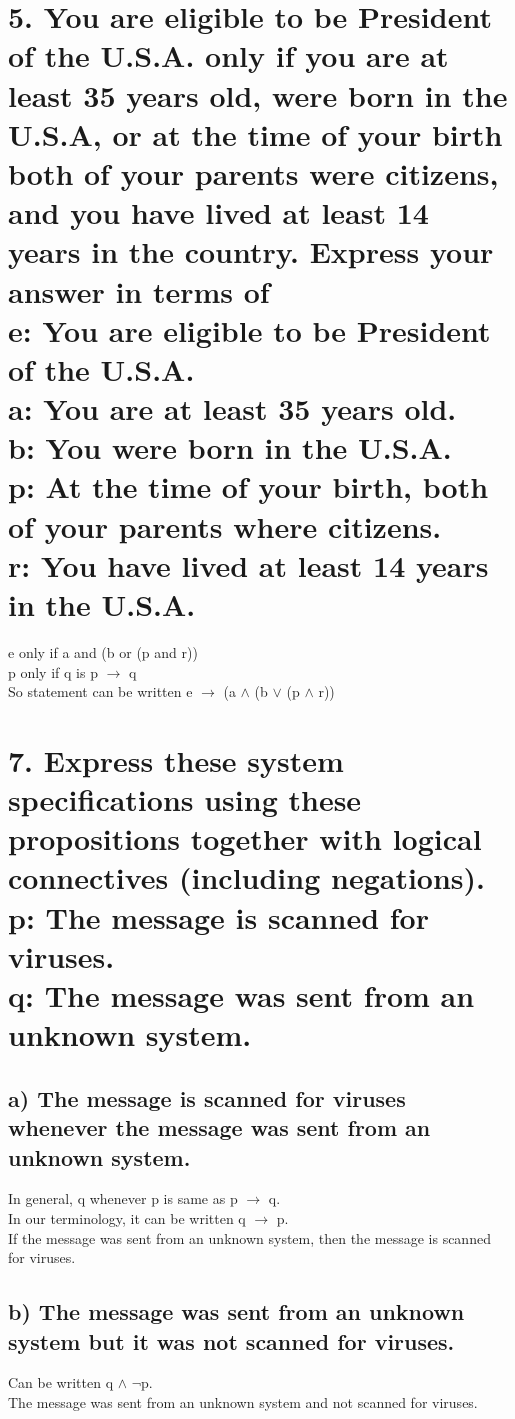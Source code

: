 \documentclass[11pt, oneside]{article} %
\numberwithin{equation}{section} %
\numberwithin{figure}{section} %
\begin{document}
\section{5. You are eligible to be President of the U.S.A. only if you are at least 35 years old, were born in the U.S.A, or at the time of your birth both of your parents were citizens, and you have lived at least 14 years in the country. Express your answer in terms of \\
e: You are eligible to be President of the U.S.A. \\
a: You are at least 35 years old.\\
b: You were born in the U.S.A. \\
p: At the time of your birth, both of your parents where citizens. \\
r: You have lived at least 14 years in the U.S.A.}
e only if a and (b or (p and r))\\
p only if q is p $\rightarrow$ q \\
So statement can be written e $\rightarrow$ (a  $\wedge$ (b $\vee$ (p $\wedge$ r))

\section{7. Express these system specifications using these propositions together with logical connectives (including negations). \\
p: The message is scanned for viruses. \\
q: The message was sent from an unknown system.}
\subsection{a) The message is scanned for viruses whenever the message was sent from an unknown system.}
In general, q whenever p is same as p $\rightarrow$ q.\\
In our terminology, it can be written q $\rightarrow$ p. \\
If the message was sent from an unknown system, then the message is scanned for viruses.
\subsection{b) The message was sent from an unknown system but it was not scanned for viruses.}
Can be written q $\wedge$ $\neg$p. \\
The message was sent from an unknown system and not scanned for viruses.
\end{document}
